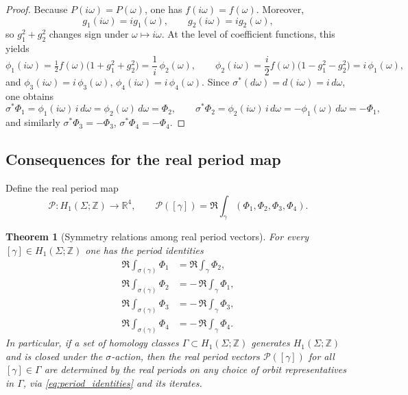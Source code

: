 \documentclass[12pt]{article}
\numberwithin{equation}{section}
\newtheorem{theorem}{Theorem}[section]
\theoremstyle{definition}
\theoremstyle{remark}
\begin{document}
\begin{proof}
Because $P(i\omega)=P(\omega)$, one has $f(i\omega)=f(\omega)$. Moreover,
\[
g_1(i\omega)=i g_1(\omega),\qquad g_2(i\omega)=i g_2(\omega),
\]
so $g_1^2+g_2^2$ changes sign under $\omega\mapsto i\omega$.
At the level of coefficient functions, this yields
\[
\phi_1(i\omega)=\tfrac12 f(\omega)\bigl(1+g_1^2+g_2^2\bigr)=\frac{1}{i}\,\phi_2(\omega),
\qquad
\phi_2(i\omega)=\frac{i}{2}f(\omega)\bigl(1-g_1^2-g_2^2\bigr)=i\,\phi_1(\omega),
\]
and $\phi_3(i\omega)=i\,\phi_3(\omega)$, $\phi_4(i\omega)=i\,\phi_4(\omega)$.
Since $\sigma^*(d\omega)=d(i\omega)=i\,d\omega$, one obtains
\[
\sigma^*\Phi_1=\phi_1(i\omega)\,i\,d\omega=\phi_2(\omega)\,d\omega=\Phi_2,
\qquad
\sigma^*\Phi_2=\phi_2(i\omega)\,i\,d\omega=-\phi_1(\omega)\,d\omega=-\Phi_1,
\]
and similarly $\sigma^*\Phi_3=-\Phi_3$, $\sigma^*\Phi_4=-\Phi_4$.
\end{proof}

\subsection{Consequences for the real period map}

Define the real period map
\[
\mathcal{P}:H_1(\Sigma;\mathbb{Z})\to\mathbb{R}^4,\qquad
\mathcal{P}([\gamma])=\Re\int_\gamma (\Phi_1,\Phi_2,\Phi_3,\Phi_4).
\]

\begin{theorem}[Symmetry relations among real period vectors]\label{thm:symmetryreduction_correct}
For every $[\gamma]\in H_1(\Sigma;\mathbb{Z})$ one has the period identities
\begin{equation}\label{eq:period_identities}
\begin{aligned}
\Re\int_{\sigma(\gamma)}\Phi_1 &= \Re\int_\gamma \Phi_2,\\
\Re\int_{\sigma(\gamma)}\Phi_2 &= -\,\Re\int_\gamma \Phi_1,\\
\Re\int_{\sigma(\gamma)}\Phi_3 &= -\,\Re\int_\gamma \Phi_3,\\
\Re\int_{\sigma(\gamma)}\Phi_4 &= -\,\Re\int_\gamma \Phi_4.
\end{aligned}
\end{equation}
In particular, if a set of homology classes $\Gamma\subset H_1(\Sigma;\mathbb{Z})$ generates $H_1(\Sigma;\mathbb{Z})$ and is closed under the $\sigma$-action, then the real period vectors $\mathcal{P}([\gamma])$ for all $[\gamma]\in\Gamma$ are determined by the real periods on any choice of orbit representatives in $\Gamma$, via \eqref{eq:period_identities} and its iterates.
\end{theorem}
\end{document}

